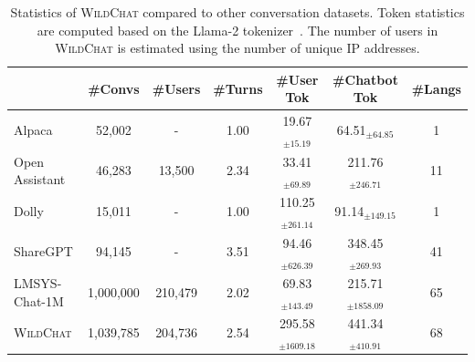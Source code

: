 \documentclass{article} %
\newcommand{\corpus}{\textsc{WildChat}\xspace}
\begin{document}



\begin{table}[!t]
\centering
\caption{\label{table:dataset_stats}Statistics of \corpus compared to other conversation datasets. Token statistics are computed based on the Llama-2 tokenizer~\citep{touvron2023llama}. The number of users in \corpus is estimated using the number of unique IP addresses.}
\begin{tabular}{@{}lcccccc@{}}
\toprule
 & \#Convs & \#Users & \#Turns & \#User Tok & \#Chatbot Tok & \#Langs\\ \midrule
Alpaca            & 52,002  & -       & 1.00 & 19.67$_{\pm{15.19}}$ & 64.51$_{\pm{64.85}}$ & 1 \\
Open Assistant    & 46,283  & 13,500  & 2.34 & 33.41$_{\pm{69.89}}$   & 211.76$_{\pm{246.71}}$ &11 \\
Dolly             & 15,011  & -       & 1.00 & 110.25$_{\pm{261.14}}$ & 91.14$_{\pm{149.15}}$ & 1 \\
ShareGPT          & 94,145  & -       & 3.51 & 94.46$_{\pm{626.39}}$  & 348.45$_{\pm{269.93}}$ & 41 \\
LMSYS-Chat-1M          &  1,000,000 & 210,479     & 2.02 & 69.83$_{\pm{143.49}}$  & 215.71$_{\pm{1858.09}}$ & 65 \\
\corpus & 1,039,785 & 204,736 & 2.54 & 295.58$_{\pm{1609.18}}$ & 441.34$_{\pm{410.91}}$  & 68 \\
\bottomrule
\end{tabular}
\end{table}
\end{document}
